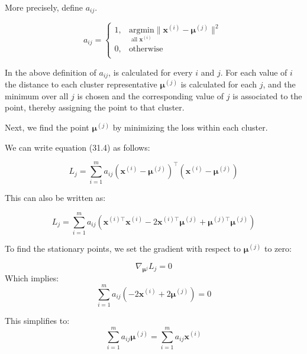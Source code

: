 \documentclass[english]{article}
\theoremstyle{plain}
\begin{document}
More precisely, define $a_{ij}$.

\begin{equation}
a_{ij} =
\begin{cases}
1, & \underset{\text{all }  \boldsymbol{x}^{(i)}}{\mathrm{argmin}} \| \boldsymbol{x}^{(i)} - \boldsymbol{\mu}^{(j)} \|^{2} \\
0, & \text{otherwise} \\
\end{cases}
\end{equation}

In the above definition of $a_{ij}$, is calculated for every $i$ and $j$. For each value of $i$ the distance to each cluster representative $\boldsymbol{\mu}^{(j)}$ is calculated for each $j$, and the minimum over all $j$ is chosen and the corresponding value of $j$ is associated to the point, thereby assigning the point to that cluster. 

Next, we find the point $\boldsymbol{\mu}^{(j)}$ by minimizing the loss within each cluster.

We can write equation (31.4) as follows:

\begin{equation}
L_{j} = \sum_{i=1}^{m} a_{ij} (\boldsymbol{x}^{(i)} - \boldsymbol{\mu}^{(j)})^{\top}(\boldsymbol{x}^{(i)} - \boldsymbol{\mu}^{(j)})
\end{equation}

This can also be written as:

\begin{equation}
L_{j} = \sum_{i=1}^{m} a_{ij} (\boldsymbol{x}^{(i)\top}\boldsymbol{x}^{(i)} -2\boldsymbol{x}^{(i)\top}
\boldsymbol{\mu}^{(j)}+ \boldsymbol{\mu}^{(j)\top}\boldsymbol{\mu}^{(j)})
\end{equation}

To find the stationary points, we set the gradient with respect to $\boldsymbol{\mu}^{(j)}$ to zero:

\begin{equation}
\nabla_{\boldsymbol{\mu}^{j}} L_{j} = 0
\end{equation}
Which implies:
\begin{equation}
\sum_{i=1}^{m} a_{ij} (-2\boldsymbol{x}^{(i)}+ 2\boldsymbol{\mu}^{(j)}) = 0
\end{equation}

This simplifies to:
\begin{equation}
\sum_{i=1}^{m} a_{ij}  \boldsymbol{\mu}^{(j)} = \sum_{i=1}^{m} a_{ij}\boldsymbol{x}^{(i)}
\end{equation}
\end{document}
